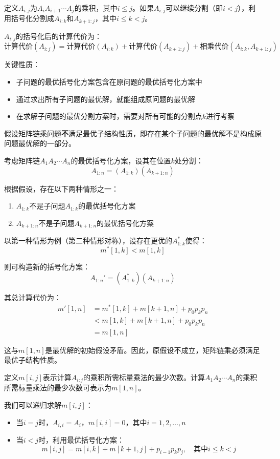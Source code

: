 \documentclass[./../main.tex]{subfiles}
\begin{document}
定义$A_{i:j}$为$A_iA_{i+1}\cdots A_j$的乘积，其中$i \leq j$。如果$A_{i:j}$可以继续分割（即$i < j$），利用括号化分割成$A_{i:k}$和$A_{k+1:j}$，其中$i \leq k < j$。


$A_{i:j}$的括号化后的计算代价为：
$$
\text{计算代价}(A_{i:j}) = \text{计算代价}(A_{i:k}) + \text{计算代价}(A_{k+1:j}) + \text{相乘代价}(A_{i:k}, A_{k+1:j})
$$

关键性质：
\begin{itemize}
    \item 子问题的最优括号化方案包含在原问题的最优括号化方案中
    \item 通过求出所有子问题的最优解，就能组成原问题的最优解
    \item 在求解子问题的最优分割方案时，需要对所有可能的分割点$k$进行考察
\end{itemize}

假设矩阵链乘问题\textbf{不}满足最优子结构性质，即存在某个子问题的最优解不是构成原问题最优解的一部分。

考虑矩阵链$A_1A_2\cdots A_n$的最优括号化方案，设其在位置$k$处分割：
$$ A_{1:n} = (A_{1:k})(A_{k+1:n}) $$

根据假设，存在以下两种情形之一：
\begin{enumerate}
    \item $A_{1:k}$不是子问题$A_{1:k}$的最优括号化方案
    \item $A_{k+1:n}$不是子问题$A_{k+1:n}$的最优括号化方案
\end{enumerate}

以第一种情形为例（第二种情形对称），设存在更优的$A_{1:k}^*$使得：
$$ m^*[1,k] < m[1,k] $$

则可构造新的括号化方案：
$$ A_{1:n}' = (A_{1:k}^*)(A_{k+1:n}) $$

其总计算代价为：
\begin{align*}
m'[1,n] &= m^*[1,k] + m[k+1,n] + p_0p_kp_n \\
&< m[1,k] + m[k+1,n] + p_0p_kp_n \\
&= m[1,n]
\end{align*}

这与$m[1,n]$是最优解的初始假设矛盾。因此，原假设不成立，矩阵链乘必须满足最优子结构性质。

定义$m[i,j]$表示计算$A_{i:j}$的乘积所需标量乘法的最少次数。计算$A_{1}A_{2}\cdots A_{n}$的乘积所需标量乘法的最少次数可表示为$m[1,n]$。

我们可以递归求解$m[i,j]$：
\begin{itemize}
\item 当$i=j$时，$A_{i,i}=A_{i}$，$m[i,i]=0$，其中$i=1,2,\ldots,n$
\item 当$i<j$时，利用最优括号化方案：
$$m[i,j]=m[i,k]+m[k+1,j]+p_{i-1}p_{k}p_{j},\quad \text{其中}i\leq k<j$$
\end{itemize}
\end{document}
